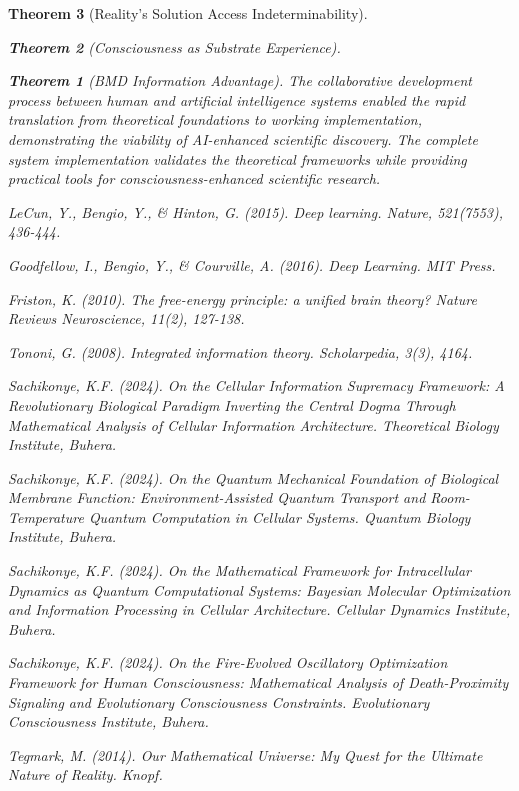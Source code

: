 \documentclass[12pt,a4paper]{article}
\newtheorem{theorem}{Theorem}[section]
\theoremstyle{remark}
\begin{document}
\begin{theorem}[Reality's Solution Access Indeterminability]
\begin{theorem}[Consciousness as Substrate Experience]
\begin{theorem}[BMD Information Advantage]
{{{The collaborative development process between human and artificial intelligence systems enabled the rapid translation from theoretical foundations to working implementation, demonstrating the viability of AI-enhanced scientific discovery. The complete system implementation validates the theoretical frameworks while providing practical tools for consciousness-enhanced scientific research.


\begin{thebibliography}{99}

LeCun, Y., Bengio, Y., \& Hinton, G. (2015). Deep learning. \textit{Nature}, 521(7553), 436-444.

Goodfellow, I., Bengio, Y., \& Courville, A. (2016). \textit{Deep Learning}. MIT Press.

Friston, K. (2010). The free-energy principle: a unified brain theory? \textit{Nature Reviews Neuroscience}, 11(2), 127-138.

Tononi, G. (2008). Integrated information theory. \textit{Scholarpedia}, 3(3), 4164.

Sachikonye, K.F. (2024). On the Cellular Information Supremacy Framework: A Revolutionary Biological Paradigm Inverting the Central Dogma Through Mathematical Analysis of Cellular Information Architecture. \textit{Theoretical Biology Institute}, Buhera.

Sachikonye, K.F. (2024). On the Quantum Mechanical Foundation of Biological Membrane Function: Environment-Assisted Quantum Transport and Room-Temperature Quantum Computation in Cellular Systems. \textit{Quantum Biology Institute}, Buhera.

Sachikonye, K.F. (2024). On the Mathematical Framework for Intracellular Dynamics as Quantum Computational Systems: Bayesian Molecular Optimization and Information Processing in Cellular Architecture. \textit{Cellular Dynamics Institute}, Buhera.

Sachikonye, K.F. (2024). On the Fire-Evolved Oscillatory Optimization Framework for Human Consciousness: Mathematical Analysis of Death-Proximity Signaling and Evolutionary Consciousness Constraints. \textit{Evolutionary Consciousness Institute}, Buhera.

Tegmark, M. (2014). \textit{Our Mathematical Universe: My Quest for the Ultimate Nature of Reality}. Knopf.


\end{thebibliography}}}}
\end{theorem}
\end{theorem}
\end{theorem}
\end{document}
